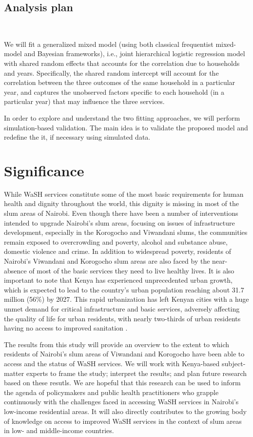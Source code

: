 \subsection*{Analysis plan}

~

We will fit a generalized mixed model (using both classical frequentist mixed-model and Bayesian frameworks), i.e., joint hierarchical logistic regression model with shared random effects that accounts for the correlation due to households and years. Specifically, the shared random intercept will account for the correlation between the three outcomes of the same household in a particular year, and captures the unobserved factors specific to each household (in a particular year) that may influence the three services.

In order to explore and understand the two fitting approaches, we will perform simulation-based validation.  The main idea is to validate the proposed model and redefine the it, if necessary using simulated data.

\section*{Significance}

While WaSH services constitute some of the most basic requirements for human health and dignity throughout the world, this dignity is missing in most of the slum areas of Nairobi. Even though there have been a number of interventions intended to upgrade Nairobi's slum areas, focusing on issues of infrastructure development, especially in the Korogocho and Viwandani slums, the communities remain exposed to overcrowding and poverty, alcohol and substance abuse, domestic violence and crime. In addition to widespread poverty, residents of Nairobi's Viwandani and Korogocho slum areas are also faced by the near-absence of most of the basic services they need to live healthy lives. It is also important to note that Kenya has experienced unprecedented urban growth, which is expected to lead to the country's urban population reaching about 31.7 million (56\%) by 2027. This rapid urbanization has left Kenyan cities with a huge unmet demand for critical infrastructure and basic services, adversely affecting the quality of life for urban residents, with nearly two-thirds of urban residents having no access to improved sanitation \citep{chikozho2019leaving}. 

The results from this study will provide an overview to the extent to which residents of Nairobi's slum areas of Viwandani and Korogocho have been able to access and the status of WaSH services. We will work with Kenya-based subject-matter experts to frame the study; interpret the results; and plan future research based on these resutls. We are hopeful that this research can be used to inform the agenda of policymakers and public health practitioners who grapple continuously with the challenges faced in accessing WaSH services in Nairobi's low-income residential areas. It will also directly contributes to the growing body of knowledge on access to improved WaSH services in the context of slum areas in low- and middle-income countries.


